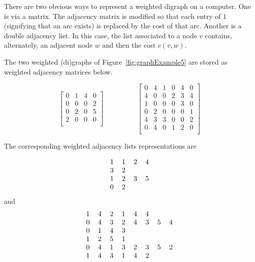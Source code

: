 There are two obvious ways to represent a weighted digraph on a
computer. One is via a matrix. The adjacency matrix is modified so that
each entry of $1$ (signifying that an arc exists) is replaced by the
cost of that arc. Another is a double adjacency list. In this case, the
list associated to a node $v$ contains, alternately, an adjacent node
$w$ and then the cost $c(v, w)$.

\begin{Example}

The two weighted (di)graphs of Figure~\ref{fig:graphExample5} are
stored as weighted adjacency matrices below.


\[ 
\left[
\begin{array}{cccc}

0 & 1 & 4 & 0  \\

0 & 0 & 0 & 2  \\

0 & 2 & 0 & 5  \\

2 & 0 & 0 & 0  \\

\end{array}
\right]
\hspace{2cm}
\left[
\begin{array}{cccccc}

0 & 4 & 1 & 0 & 4 & 0 \\

4 & 0 & 0 & 2 & 3 & 4 \\

1 & 0 & 0 & 0 & 3 & 0 \\

0 & 2 & 0 & 0 & 0 & 1 \\

4 & 3 & 3 & 0 & 0 & 2 \\

0 & 4 & 0 & 1 & 2 & 0 \\

\end{array}
\right]
\]


The corresponding weighted adjacency lists representations are

$$
\begin{tabular}{llll}
1 & 1 & 2 & 4 \\
3 & 2 &   &   \\
1 & 2 & 3 & 5 \\
0 & 2 &   & \\
\end{tabular}
$$
 and \hspace{2cm}
$$
\begin{tabular}{llllllll}
1 & 4 & 2 & 1 & 4 & 4 & & \\
0 & 4 & 3 & 2 & 4 & 3 & 5 & 4 \\
0 & 1 & 4 & 3 & & & & \\
1 & 2 & 5 & 1 & & & & \\
0 & 4 & 1 & 3 & 2 & 3 & 5 & 2 \\
1 & 4 & 3 & 1 & 4 & 2 & & \\
\end{tabular}
$$

\end{Example}

